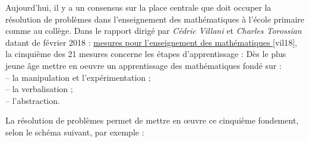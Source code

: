 \medskip

Aujourd’hui, il y a un consensus sur la place centrale que doit occuper la résolution de problèmes dans l’enseignement des mathématiques à l’école primaire comme au collège. Dans le rapport dirigé par {\it Cédric Villani} et {\it Charles Torossian} datant de février 2018 : \href{https://www.education.gouv.fr/21-mesures-pour-l-enseignement-des-mathematiques-3242}{\blue{} mesures pour l'enseignement des mathématiques \fg} [vil18], la cinquième des 21 mesures concerne les étapes d'apprentissage : 
\og Dès le plus jeune âge mettre en oeuvre un apprentissage des mathématiques fondé sur : \\
   -- la manipulation et l’expérimentation ; \\
   -- la verbalisation ; \\
   -- l’abstraction. \fg

La résolution de problèmes permet de mettre en \oe uvre ce cinquième fondement, selon le schéma suivant, par exemple :

